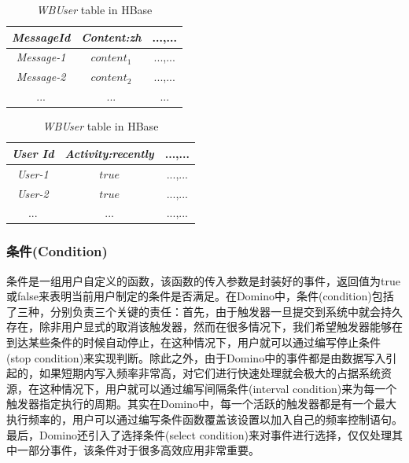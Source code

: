 \begin{table}[hb]
	\begin{minipage}[t]{0.5\linewidth}
	\centering
	\caption{\textit{WBContent} table in HBase}
	\label{table:wbcontent}
	\begin{tabular}{|c|c|c|}
		\hline
		\textit{MessageId} & \textit{Content:zh} & ...,... \\
		\hline
		\textit{Message-1} & $content_{1}$ & ...,... \\
		\hline
		\textit{Message-2} & $content_{2}$ & ...,... \\
		\hline
		... & ... & ...\\
		\hline
	\end{tabular}
	\end{minipage}
	\begin{minipage}[t]{0.5\linewidth}
	\caption{\textit{WBUser} table in HBase}
	\label{table:wbuser}
	\centering
		\begin{tabular}{|c|c|c|}
			\hline
			\textit{User Id} & \textit{Activity:recently} & ...,... \\
			\hline
			\textit{User-1} & $true$ & ...,... \\
			\hline
			\textit{User-2} & $true$ & ...,... \\
			\hline
			... & ... & ...,...\\
			\hline
		\end{tabular}
	\end{minipage}
\end{table}

\subsubsection{条件(Condition)}
条件是一组用户自定义的函数，该函数的传入参数是封装好的事件，返回值为true或false来表明当前用户制定的条件是否满足。在Domino中，条件(condition)包括了三种，分别负责三个关键的责任：首先，由于触发器一旦提交到系统中就会持久存在，除非用户显式的取消该触发器，然而在很多情况下，我们希望触发器能够在到达某些条件的时候自动停止，在这种情况下，用户就可以通过编写停止条件(stop condition)来实现判断。除此之外，由于Domino中的事件都是由数据写入引起的，如果短期内写入频率非常高，对它们进行快速处理就会极大的占据系统资源，在这种情况下，用户就可以通过编写间隔条件(interval condition)来为每一个触发器指定执行的周期。其实在Domino中，每一个活跃的触发器都是有一个最大执行频率的，用户可以通过编写条件函数覆盖该设置以加入自己的频率控制语句。最后，Domino还引入了选择条件(select condition)来对事件进行选择，仅仅处理其中一部分事件，该条件对于很多高效应用非常重要。

